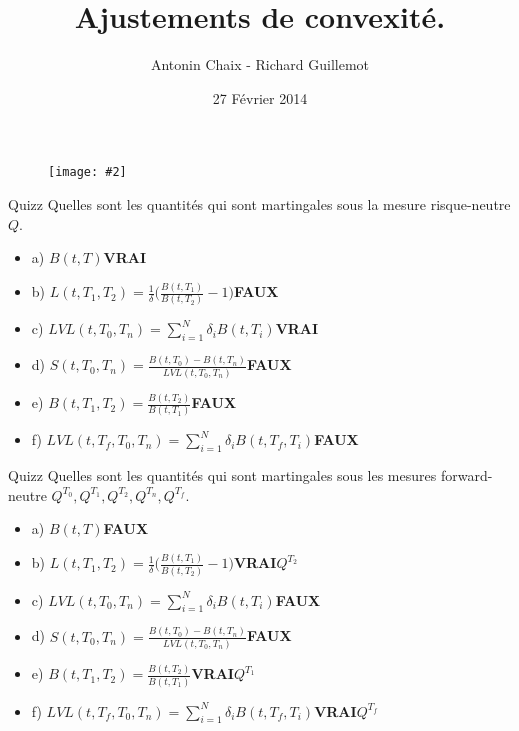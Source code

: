 \documentclass{beamer}
\title[Produits dérivés de taux]{Ajustements de convexité. }
\author{Antonin Chaix - Richard Guillemot}
\institute{Master IFMA}
\date{27 Février 2014}
\newcommand{\FIG}[2]{\texttt{[image: \#2]}}
\begin{document}
\begin{frame}
\titlepage
\begin{figure}[h]
\centering \FIG{5cm}{figures/UPMC_IFMA.jpg}
\end{figure}
\end{frame}

\begin{frame}{Quizz}
Quelles sont les quantités qui sont martingales sous la mesure risque-neutre $Q$.
\begin{itemize}
\item a) $B(t,T)$\textbf{\color{green}VRAI} 
\item b) $L(t,T_1,T_2)=\frac{1}{\delta}\big(\frac{B(t,T_1)}{B(t,T_2)}-1 \big)$\textbf{\color{red}FAUX}
\item c) $\displaystyle LVL(t,T_0,T_n)=\sum_{i=1}^{N}\delta_i B(t,T_i)$\textbf{\color{green}VRAI}
\item d) $S(t,T_0,T_n)=\frac{B(t,T_0)-B(t,T_n)}{LVL(t,T_0,T_n)}$\textbf{\color{red}FAUX}
\item e) $B(t,T_1,T_2)=\frac{B(t,T_2)}{B(t,T_1)}$\textbf{\color{red}FAUX} 
\item f) $\displaystyle LVL(t,T_f,T_0,T_n)=\sum_{i=1}^{N}\delta_i B(t,T_f,T_i)$\textbf{\color{red}FAUX}
\end{itemize}
\end{frame}


\begin{frame}{Quizz}
Quelles sont les quantités qui sont martingales sous les mesures forward-neutre $Q^{T_0}, Q^{T_1},Q^{T_2}, Q^{T_n}, Q^{T_f}$.
\begin{itemize}
\item a) $B(t,T)$\textbf{\color{red}FAUX}
\item b) $L(t,T_1,T_2)=\frac{1}{\delta}\big(\frac{B(t,T_1)}{B(t,T_2)}-1 \big)$\textbf{\color{green}VRAI}$Q^{T_2}$
\item c) $\displaystyle LVL(t,T_0,T_n)=\sum_{i=1}^{N}\delta_i B(t,T_i)$\textbf{\color{red}FAUX}
\item d) $S(t,T_0,T_n)=\frac{B(t,T_0)-B(t,T_n)}{LVL(t,T_0,T_n)}$\textbf{\color{red}FAUX}
\item e) $B(t,T_1,T_2)=\frac{B(t,T_2)}{B(t,T_1)}$\textbf{\color{green}VRAI}$Q^{T_1}$ 
\item f) $\displaystyle LVL(t,T_f,T_0,T_n)=\sum_{i=1}^{N}\delta_i B(t,T_f,T_i)$\textbf{\color{green}VRAI}$Q^{T_f}$
\end{itemize}
\end{frame}
\end{document}
